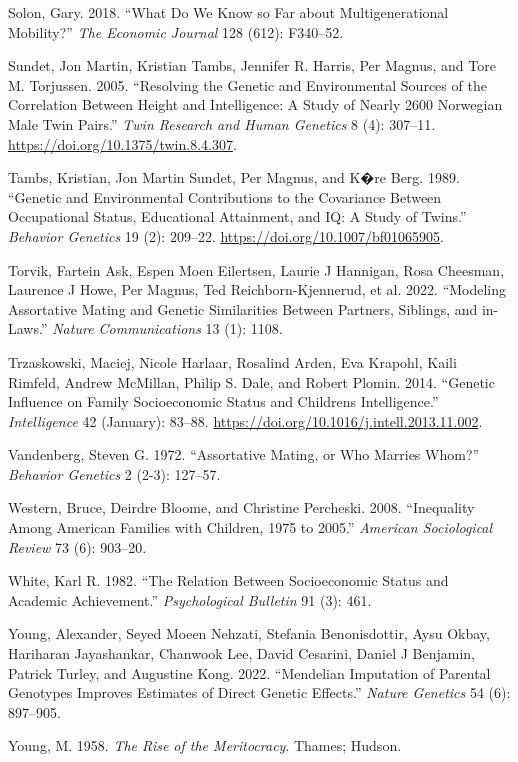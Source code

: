 \documentclass[
  12pt,
]{article}
\newlength{\cslhangindent}
\newlength{\cslentryspacingunit} %
\newenvironment{CSLReferences}[2] %
 {%
  \setlength{\parindent}{0pt}
  \ifodd #1
  \let\oldpar\par
  \def\par{\hangindent=\cslhangindent\oldpar}
  \fi
  \setlength{\parskip}{#2\cslentryspacingunit}
 }%
 {}
\theoremstyle{definition}
\theoremstyle{definition}
\theoremstyle{definition}
\theoremstyle{definition}
\theoremstyle{remark}
\begin{document}
\begin{CSLReferences}{1}{0}
\leavevmode{}%
Solon, Gary. 2018. {``What Do We Know so Far about Multigenerational Mobility?''} \emph{The Economic Journal} 128 (612): F340--52.

\leavevmode{}%
Sundet, Jon Martin, Kristian Tambs, Jennifer R. Harris, Per Magnus, and Tore M. Torjussen. 2005. {``Resolving the Genetic and Environmental Sources of the Correlation Between Height and Intelligence: A Study of Nearly 2600 Norwegian Male Twin Pairs.''} \emph{Twin Research and Human Genetics} 8 (4): 307--11. \url{https://doi.org/10.1375/twin.8.4.307}.

\leavevmode{}%
Tambs, Kristian, Jon Martin Sundet, Per Magnus, and K�re Berg. 1989. {``Genetic and Environmental Contributions to the Covariance Between Occupational Status, Educational Attainment, and {IQ}: A Study of Twins.''} \emph{Behavior Genetics} 19 (2): 209--22. \url{https://doi.org/10.1007/bf01065905}.

\leavevmode{}%
Torvik, Fartein Ask, Espen Moen Eilertsen, Laurie J Hannigan, Rosa Cheesman, Laurence J Howe, Per Magnus, Ted Reichborn-Kjennerud, et al. 2022. {``Modeling Assortative Mating and Genetic Similarities Between Partners, Siblings, and in-Laws.''} \emph{Nature Communications} 13 (1): 1108.

\leavevmode{}%
Trzaskowski, Maciej, Nicole Harlaar, Rosalind Arden, Eva Krapohl, Kaili Rimfeld, Andrew McMillan, Philip S. Dale, and Robert Plomin. 2014. {``Genetic Influence on Family Socioeconomic Status and Children{\textquotesingle}s Intelligence.''} \emph{Intelligence} 42 (January): 83--88. \url{https://doi.org/10.1016/j.intell.2013.11.002}.

\leavevmode{}%
Vandenberg, Steven G. 1972. {``Assortative Mating, or Who Marries Whom?''} \emph{Behavior Genetics} 2 (2-3): 127--57.

\leavevmode{}%
Western, Bruce, Deirdre Bloome, and Christine Percheski. 2008. {``Inequality Among American Families with Children, 1975 to 2005.''} \emph{American Sociological Review} 73 (6): 903--20.

\leavevmode{}%
White, Karl R. 1982. {``The Relation Between Socioeconomic Status and Academic Achievement.''} \emph{Psychological Bulletin} 91 (3): 461.

\leavevmode{}%
Young, Alexander, Seyed Moeen Nehzati, Stefania Benonisdottir, Aysu Okbay, Hariharan Jayashankar, Chanwook Lee, David Cesarini, Daniel J Benjamin, Patrick Turley, and Augustine Kong. 2022. {``Mendelian Imputation of Parental Genotypes Improves Estimates of Direct Genetic Effects.''} \emph{Nature Genetics} 54 (6): 897--905.

\leavevmode{}%
Young, M. 1958. \emph{The Rise of the Meritocracy}. Thames; Hudson.

\end{CSLReferences}
\end{document}
